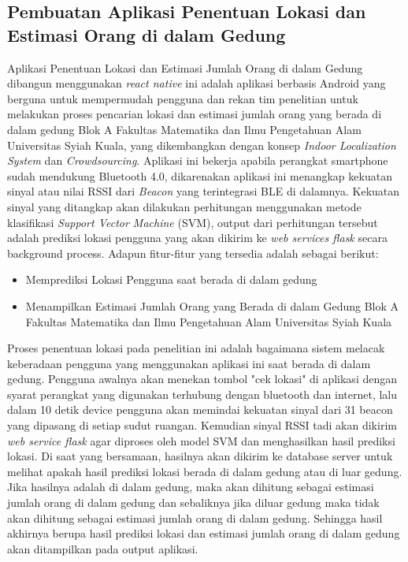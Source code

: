 \subsection{Pembuatan Aplikasi Penentuan Lokasi dan Estimasi Orang di dalam Gedung}
\par Aplikasi Penentuan Lokasi dan Estimasi Jumlah Orang di dalam Gedung dibangun menggunakan \textit{react native} ini adalah aplikasi berbasis Android yang berguna untuk mempermudah pengguna dan rekan tim penelitian untuk melakukan proses pencarian lokasi dan estimasi jumlah orang yang berada di dalam gedung Blok A Fakultas Matematika dan Ilmu Pengetahuan Alam Universitas Syiah Kuala, yang dikembangkan dengan konsep \textit{Indoor Localization System} dan \textit{Crowdsourcing}. Aplikasi ini bekerja apabila perangkat smartphone sudah mendukung Bluetooth 4.0, dikarenakan aplikasi ini menangkap kekuatan sinyal atau nilai RSSI dari \textit{Beacon} yang terintegrasi BLE di dalamnya. Kekuatan sinyal yang ditangkap akan dilakukan perhitungan menggunakan metode klasifikasi \textit{Support Vector Machine} (SVM), output dari perhitungan tersebut adalah prediksi lokasi pengguna yang akan dikirim ke \textit{web services flask} secara background process. Adapun fitur-fitur yang tersedia adalah sebagai berikut:

\begin {itemize}
\itemsep0em
\item Memprediksi Lokasi Pengguna saat berada di dalam gedung
\item Menampilkan Estimasi Jumlah Orang yang Berada di dalam Gedung Blok A Fakultas Matematika dan Ilmu Pengetahuan Alam Universitas Syiah Kuala
\end{itemize}

\par Proses penentuan lokasi pada penelitian ini adalah bagaimana sistem melacak keberadaan pengguna yang menggunakan aplikasi ini saat berada di dalam gedung.
Pengguna awalnya akan menekan tombol "cek lokasi" di aplikasi dengan syarat perangkat yang digunakan terhubung dengan bluetooth dan internet, lalu dalam 10 detik
device pengguna akan memindai kekuatan sinyal dari 31 beacon yang dipasang di setiap sudut ruangan. Kemudian sinyal RSSI tadi akan dikirim \textit{web service flask} agar diproses
oleh model SVM dan menghasilkan hasil prediksi lokasi. Di saat yang bersamaan, hasilnya akan dikirim ke database server untuk melihat apakah hasil prediksi lokasi berada
di dalam gedung atau di luar gedung. Jika hasilnya adalah di dalam gedung, maka akan dihitung sebagai estimasi jumlah orang di dalam gedung dan sebaliknya jika diluar gedung maka tidak akan
dihitung sebagai estimasi jumlah orang di dalam gedung. Sehingga hasil akhirnya berupa hasil prediksi lokasi dan estimasi jumlah orang di dalam gedung akan ditampilkan pada output aplikasi.


